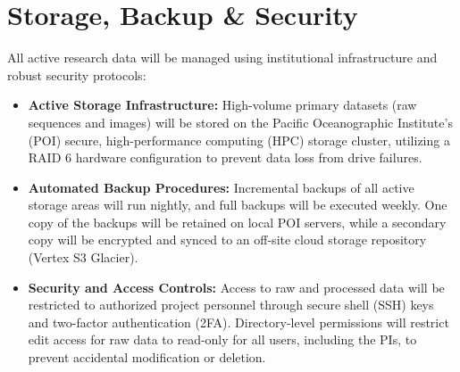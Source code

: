 \section{Storage, Backup \& Security}
All active research data will be managed using institutional infrastructure and robust security protocols:
\begin{itemize}
    \item \textbf{Active Storage Infrastructure:} High-volume primary datasets (raw sequences and images) will be stored on the Pacific Oceanographic Institute's (POI) secure, high-performance computing (HPC) storage cluster, utilizing a RAID 6 hardware configuration to prevent data loss from drive failures.
    \item \textbf{Automated Backup Procedures:} Incremental backups of all active storage areas will run nightly, and full backups will be executed weekly. One copy of the backups will be retained on local POI servers, while a secondary copy will be encrypted and synced to an off-site cloud storage repository (Vertex S3 Glacier).
    \item \textbf{Security and Access Controls:} Access to raw and processed data will be restricted to authorized project personnel through secure shell (SSH) keys and two-factor authentication (2FA). Directory-level permissions will restrict edit access for raw data to read-only for all users, including the PIs, to prevent accidental modification or deletion.
\end{itemize}
